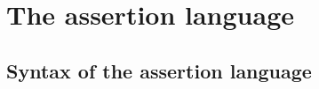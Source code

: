 \documentclass[12pt,a4paper]{report}
\newcommand{\scon}{\nstyle{con}}
\begin{document}
%
%
%
%
%
%
%



\chapter{The assertion language}



\section{Syntax of the assertion language}
\end{document}
